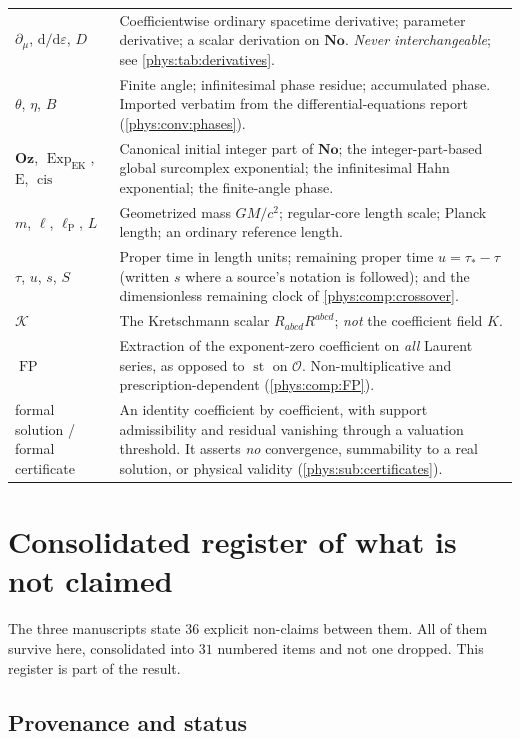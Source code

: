 \documentclass[11pt,letterpaper]{article}
\numberwithin{equation}{section}
\theoremstyle{definition}
\theoremstyle{remark}
\newcommand{\No}{\mathbf{No}}
\newcommand{\eps}{\varepsilon}
\newcommand{\Ofin}{\mathcal O}
\newcommand{\Kret}{\mathcal K}
\newcommand{\lP}{\ell_{\mathrm P}}
\DeclareMathOperator{\st}{st}
\DeclareMathOperator{\FP}{FP}
\DeclareMathOperator{\cis}{cis}
\newcommand{\Oz}{\mathbf{Oz}}
\newcommand{\dd}{\mathrm d}
\newcommand{\ExpEK}{\operatorname{Exp}_{\mathrm{EK}}}
\newcommand{\Emm}{\mathrm{E}}
\begin{document}
\begin{longtable}{@{}L{0.21\textwidth}L{0.73\textwidth}@{}}
\addlinespace
$\partial_{\mu}$, $\dd/\dd\eps$, $D$ &
Coefficientwise ordinary spacetime derivative; parameter derivative; a scalar
derivation on $\No$. \emph{Never interchangeable}; see
\cref{phys:tab:derivatives}. \\
\addlinespace
$\theta$, $\eta$, $B$ &
Finite angle; infinitesimal phase residue; accumulated phase. Imported
verbatim from the differential-equations report
(\cref{phys:conv:phases}). \\
\addlinespace
$\Oz$, $\ExpEK$, $\Emm$, $\cis$ &
Canonical initial integer part of $\No$; the integer-part-based global
surcomplex exponential; the infinitesimal Hahn exponential; the finite-angle
phase. \\
\addlinespace
$m$, $\ell$, $\lP$, $L$ &
Geometrized mass $GM/c^{2}$; regular-core length scale; Planck length; an
ordinary reference length. \\
\addlinespace
$\tau$, $u$, $s$, $S$ &
Proper time in length units; remaining proper time $u=\tau_{*}-\tau$ (written
$s$ where a source's notation is followed); and the dimensionless remaining
clock of \cref{phys:comp:crossover}. \\
\addlinespace
$\Kret$ &
The Kretschmann scalar $R_{abcd}R^{abcd}$; \emph{not} the coefficient field
$K$. \\
\addlinespace
$\FP$ &
Extraction of the exponent-zero coefficient on \emph{all} Laurent series, as
opposed to $\st$ on $\Ofin$. Non-multiplicative and prescription-dependent
(\cref{phys:comp:FP}). \\
\addlinespace
formal solution / formal certificate &
An identity coefficient by coefficient, with support admissibility and residual
vanishing through a valuation threshold. It asserts \emph{no} convergence,
summability to a real solution, or physical validity
(\cref{phys:sub:certificates}). \\
\end{longtable}

\section{Consolidated register of what is not claimed}
\label{phys:app:nonclaims}

The three manuscripts state $36$ explicit non-claims between them. All of them
survive here, consolidated into $31$ numbered items and not one dropped. This
register is part of the result.

\subsection{Provenance and status}
\label{phys:app:sub:nc-provenance}
\end{document}
